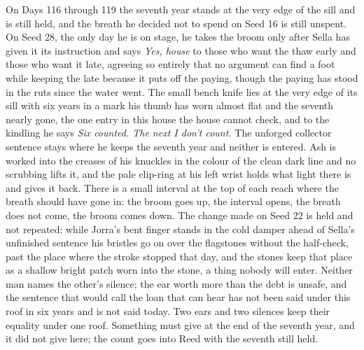 \documentclass{design/chronicle}
\begin{document}
{On Days 116 through 119 the seventh year stands at the very edge of the sill and is still held, and the breath he decided not to spend on Seed 16 is still unspent. On Seed 28, the only day he is on stage, he takes the broom only after Sella has given it its instruction and says \emph{Yes, house} to those who want the thaw early and those who want it late, agreeing so entirely that no argument can find a foot while keeping the late because it puts off the paying, though the paying has stood in the ruts since the water went. The small bench knife lies at the very edge of its sill with six years in a mark his thumb has worn almost flat and the seventh nearly gone, the one entry in this house the house cannot check, and to the kindling he says \emph{Six counted. The next I don’t count.} The unforged collector sentence stays where he keeps the seventh year and neither is entered. Ash is worked into the creases of his knuckles in the colour of the clean dark line and no scrubbing lifts it, and the pale clip-ring at his left wrist holds what light there is and gives it back. There is a small interval at the top of each reach where the breath should have gone in: the broom goes up, the interval opens, the breath does not come, the broom comes down. The change made on Seed 22 is held and not repeated: while Jorra’s bent finger stands in the cold damper ahead of Sella’s unfinished sentence his bristles go on over the flagstones without the half-check, past the place where the stroke stopped that day, and the stones keep that place as a shallow bright patch worn into the stone, a thing nobody will enter. Neither man names the other’s silence; the ear worth more than the debt is unsafe, and the sentence that would call the loan that can hear has not been said under this roof in six years and is not said today. Two ears and two silences keep their equality under one roof. Something must give at the end of the seventh year, and it did not give here; the count goes into Reed with the seventh still held.

}
\end{document}
